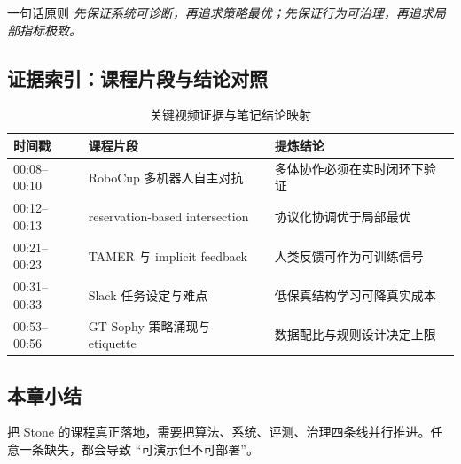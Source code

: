 \begin{importantbox}{一句话原则}
\textit{先保证系统可诊断，再追求策略最优；先保证行为可治理，再追求局部指标极致。}
\end{importantbox}

\subsection{证据索引：课程片段与结论对照}
\begin{table}[H]
\centering
\begin{tabular}{p{2.6cm}p{4.9cm}p{4.1cm}}
\toprule
\textbf{时间戳} & \textbf{课程片段} & \textbf{提炼结论} \\
\midrule
00:08--00:10 & RoboCup 多机器人自主对抗 & 多体协作必须在实时闭环下验证 \\
00:12--00:13 & reservation-based intersection & 协议化协调优于局部最优 \\
00:21--00:23 & TAMER 与 implicit feedback & 人类反馈可作为可训练信号 \\
00:31--00:33 & Slack 任务设定与难点 & 低保真结构学习可降真实成本 \\
00:53--00:56 & GT Sophy 策略涌现与 etiquette & 数据配比与规则设计决定上限 \\
\bottomrule
\end{tabular}
\caption{关键视频证据与笔记结论映射}
\end{table}

\subsection{本章小结}
把 Stone 的课程真正落地，需要把算法、系统、评测、治理四条线并行推进。任意一条缺失，都会导致 ``可演示但不可部署''。

